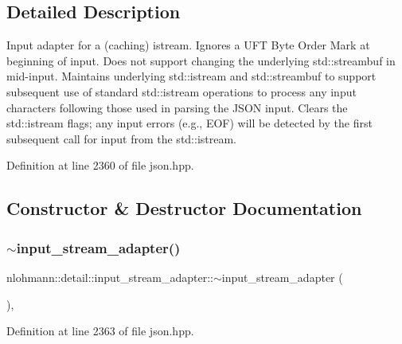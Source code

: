 \subsection{Detailed Description}
Input adapter for a (caching) istream. Ignores a U\+FT Byte Order Mark at beginning of input. Does not support changing the underlying std\+::streambuf in mid-\/input. Maintains underlying std\+::istream and std\+::streambuf to support subsequent use of standard std\+::istream operations to process any input characters following those used in parsing the J\+S\+ON input. Clears the std\+::istream flags; any input errors (e.\+g., E\+OF) will be detected by the first subsequent call for input from the std\+::istream. 

Definition at line 2360 of file json.\+hpp.



\subsection{Constructor \& Destructor Documentation}
\mbox{\label{classnlohmann_1_1detail_1_1input__stream__adapter_a2d71eb469267abd864f765481d1e823f}} 
\subsubsection{\texorpdfstring{$\sim$input\_stream\_adapter()}{~input\_stream\_adapter()}}
{\footnotesize\ttfamily nlohmann\+::detail\+::input\+\_\+stream\+\_\+adapter\+::$\sim$input\+\_\+stream\+\_\+adapter (\begin{DoxyParamCaption}{ }\end{DoxyParamCaption})\hspace{0.3cm}{\ttfamily [inline]}, {\ttfamily [override]}}



Definition at line 2363 of file json.\+hpp.

\mbox{\label{classnlohmann_1_1detail_1_1input__stream__adapter_af487152e4606d013eb4ec6a90eaf82ea}} 
